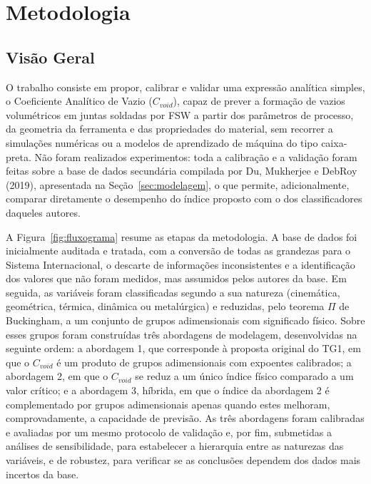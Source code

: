 \documentclass[12pt,openany]{report}
\begin{document}
\chapter{Metodologia}
\label{cap:metodologia}

\section{Visão Geral}
\label{sec:visao_geral}

O trabalho consiste em propor, calibrar e validar uma expressão analítica simples, o Coeficiente Analítico de Vazio ($C_{void}$), capaz de prever a formação de vazios volumétricos em juntas soldadas por FSW a partir dos parâmetros de processo, da geometria da ferramenta e das propriedades do material, sem recorrer a simulações numéricas ou a modelos de aprendizado de máquina do tipo caixa-preta. Não foram realizados experimentos: toda a calibração e a validação foram feitas sobre a base de dados secundária compilada por Du, Mukherjee e DebRoy (2019), apresentada na Seção~\ref{sec:modelagem}, o que permite, adicionalmente, comparar diretamente o desempenho do índice proposto com o dos classificadores daqueles autores.

A Figura~\ref{fig:fluxograma} resume as etapas da metodologia. A base de dados foi inicialmente auditada e tratada, com a conversão de todas as grandezas para o Sistema Internacional, o descarte de informações inconsistentes e a identificação dos valores que não foram medidos, mas assumidos pelos autores da base. Em seguida, as variáveis foram classificadas segundo a sua natureza (cinemática, geométrica, térmica, dinâmica ou metalúrgica) e reduzidas, pelo teorema $\Pi$ de Buckingham, a um conjunto de grupos adimensionais com significado físico. Sobre esses grupos foram construídas três abordagens de modelagem, desenvolvidas na seguinte ordem: a abordagem 1, que corresponde à proposta original do TG1, em que o $C_{void}$ é um produto de grupos adimensionais com expoentes calibrados; a abordagem 2, em que o $C_{void}$ se reduz a um único índice físico comparado a um valor crítico; e a abordagem 3, híbrida, em que o índice da abordagem 2 é complementado por grupos adimensionais apenas quando estes melhoram, comprovadamente, a capacidade de previsão. As três abordagens foram calibradas e avaliadas por um mesmo protocolo de validação e, por fim, submetidas a análises de sensibilidade, para estabelecer a hierarquia entre as naturezas das variáveis, e de robustez, para verificar se as conclusões dependem dos dados mais incertos da base.
\end{document}

